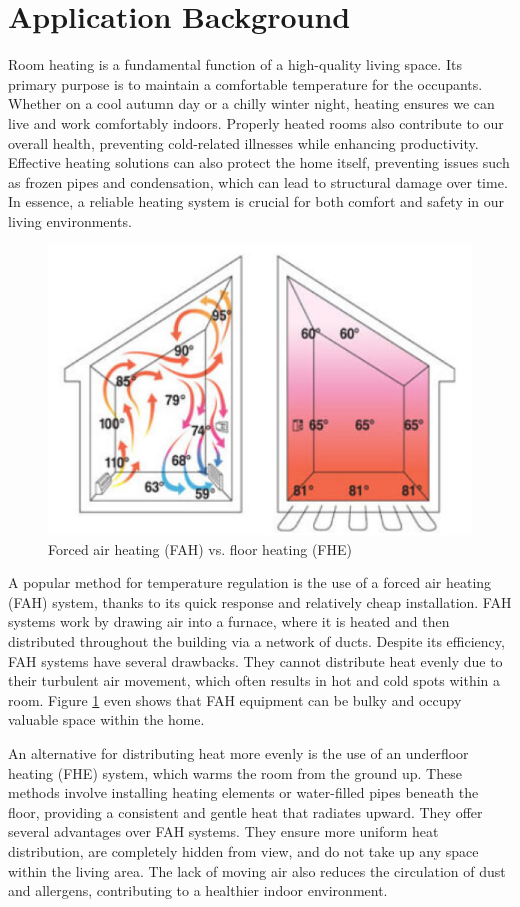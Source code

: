 \documentclass[../main.tex]{subfiles}
\begin{document}
\section{Application Background}
Room heating is a fundamental function of a high-quality living space. Its primary purpose is to maintain a comfortable temperature for the occupants. Whether on a cool autumn day or a chilly winter night, heating ensures we can live and work comfortably indoors. Properly heated rooms also contribute to our overall health, preventing cold-related illnesses while enhancing productivity. Effective heating solutions can also protect the home itself, preventing issues such as frozen pipes and condensation, which can lead to structural damage over time. In essence, a reliable heating system is crucial for both comfort and safety in our living environments.
\begin{figure}[H]
    \centering
    \includegraphics[width=0.8\linewidth]{figures/room_heating_setups.png}
    \caption{Forced air heating (FAH) vs. floor heating (FHE)\cite{junior22}}
    \label{fig:room_heating_setups}
\end{figure}

A popular method for temperature regulation is the use of a forced air heating (FAH) system, thanks to its quick response and relatively cheap installation. FAH systems work by drawing air into a furnace, where it is heated and then distributed throughout the building via a network of ducts. Despite its efficiency, FAH systems have several drawbacks. They cannot distribute heat evenly due to their turbulent air movement, which often results in hot and cold spots within a room. Figure \ref{fig:room_heating_setups} even shows that FAH equipment can be bulky and occupy valuable space within the home.

An alternative for distributing heat more evenly is the use of an underfloor heating (FHE) system, which warms the room from the ground up. These methods involve installing heating elements or water-filled pipes beneath the floor, providing a consistent and gentle heat that radiates upward. They offer several advantages over FAH systems. They ensure more uniform heat distribution, are completely hidden from view, and do not take up any space within the living area. The lack of moving air also reduces the circulation of dust and allergens, contributing to a healthier indoor environment.
\end{document}
